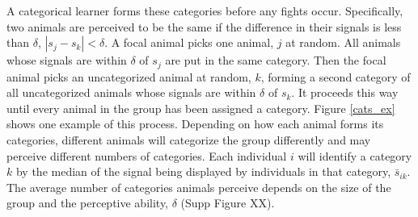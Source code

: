 A categorical learner forms these categories before any fights occur. Specifically, two animals are perceived to be the same if the difference in their signals is less than $\delta$, $|s_j-s_k|<\delta$. A focal animal picks one animal, $j$ at random. All animals whose signals are within $\delta$ of $s_j$ are put in the same category. Then the focal animal picks an uncategorized animal at random, $k$, forming a second category of all uncategorized animals whose signals are within $\delta$ of $s_k$. It proceeds this way until every animal in the group has been assigned a category.  Figure \ref{cats_ex} shows one example of this process. Depending on how each animal forms its categories, different animals will categorize the group differently and may perceive different numbers of categories. Each individual $i$ will identify a category $k$ by the median of the signal being displayed by individuals in that category, $\bar{s}_{ik}$. The average number of categories  animals perceive depends on the size of the group and the perceptive ability, $\delta$ (Supp Figure XX). 

